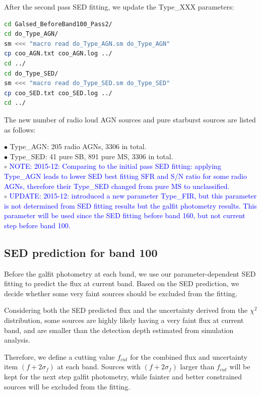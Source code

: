 \documentclass[11pt,a4paper]{article}
\begin{document}
After the second pass SED fitting, we update the Type\_XXX parameters: 

\begin{lstlisting}[language=bash]
cd Galsed_BeforeBand100_Pass2/
cd do_Type_AGN/
sm <<< "macro read do_Type_AGN.sm do_Type_AGN"
cp coo_AGN.txt coo_AGN.log ../
cd ../
cd do_Type_SED/
sm <<< "macro read do_Type_SED.sm do_Type_SED"
cp coo_SED.txt coo_SED.log ../
cd ../
\end{lstlisting}

The new number of radio loud AGN sources and pure starburst sources are listed as follows:

\indent\hspace{15pt}$\bullet$ 
Type\_AGN: 205 radio AGNs, 3306 in total. 
\\
\indent\hspace{15pt}$\bullet$ 
Type\_SED: 41 pure SB, 891 pure MS, 3306 in total. 
\\
\indent\hspace{15pt}$\circ$ 
\textcolor{blue}{NOTE: 2015-12: Comparing to the initial pass SED fitting: applying Type\_AGN leads to lower SED best fitting SFR and S/N ratio for some radio AGNs, therefore their Type\_SED changed from pure MS to unclassified.}
\\
\indent\hspace{15pt}$\circ$ 
\textcolor{blue}{UPDATE: 2015-12: introduced a new parameter Type\_FIR, but this parameter is not determined from SED fitting results but the galfit photometry results. This parameter will be used since the SED fitting before band 160, but not current step before band 100.}
\\


\subsection{SED prediction for band 100}
\label{Band100_Galpre}

Before the galfit photometry at each band, we use our parameter-dependent SED fitting to predict the flux at current band. Based on the SED prediction, we decide whether some very faint sources should be excluded from the fitting. 

Considering both the SED predicted flux and the uncertainty derived from the $\chi^2$ distribution, some sources are highly likely having a very faint flux at current band, and are smaller than the detection depth estimated from simulation analysis. 

Therefore, we define a cutting value $f_{cut}$ for the combined flux and uncertainty item $(f+2\sigma_{f})$ at each band. Sources with $(f+2\sigma_{f})$ larger than $f_{cut}$ will be kept for the next step galfit photometry, while fainter and better constrained sources will be excluded from the fitting.
\end{document}

